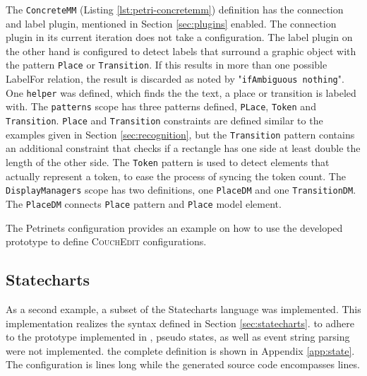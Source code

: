 The \texttt{ConcreteMM} (Listing \ref{lst:petri-concretemm}) definition has the connection and label  plugin, mentioned in Section \ref{sec:plugins} enabled. The connection plugin in its current iteration does not take a configuration. The label plugin on the other hand is configured to detect labels that surround a graphic object with the pattern \texttt{Place} or \texttt{Transition}. If this results in more than one possible LabelFor relation, the result is discarded as noted by "\texttt{ifAmbiguous nothing}". One \texttt{helper} was defined, which finds the the text, a place or transition is labeled with. The \texttt{patterns} scope has three patterns defined, \texttt{PLace}, \texttt{Token} and \texttt{Transition}. \texttt{Place} and \texttt{Transition} constraints are defined similar to the examples given in Section \ref{sec:recognition}, but the \texttt{Transition} pattern contains an additional constraint that checks if a rectangle has one side at least double the length of the other side. The \texttt{Token} pattern is used to detect elements that actually represent a token, to ease the process of syncing the token count. The \texttt{DisplayManagers} scope has two definitions, one \texttt{PlaceDM} and one \texttt{TransitionDM}. The \texttt{PlaceDM} connects \texttt{Place} pattern and \texttt{Place} model element.

The Petrinets configuration provides an example on how to use the developed prototype to define \textsc{CouchEdit} configurations. 



\subsection{Statecharts}
\label{sec:state-impl}
As a second example, a subset of the Statecharts language was implemented. This implementation realizes the syntax defined in Section \ref{sec:statecharts}. to adhere to the prototype implemented in \cite{nachreiner_couchedit_2020}, pseudo states, as well as event string parsing were not implemented. the complete definition is shown in Appendix \ref{app:state}. The configuration is \stateConfigLoC lines long while the generated source code encompasses \stateGeneratedLoC lines.

